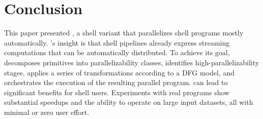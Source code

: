 \documentclass[letterpaper,twocolumn,10pt]{article}
\newcommand{\kk}[1]{[{\color{magenta}kk: #1}]}
\newcommand{\km}[1]{[{\color{blue}km: #1}]}
\begin{document}


  

  


\section{Conclusion}
\label{discussion}

This paper presented \sys, a shell variant that parallelizes shell programs mostly automatically.
\sys's insight is that shell pipelines already express streaming computations that can be automatically distributed.
To achieve its goal, \sys
  decomposes primitives into parallelizability classes,
  identifies high-parallelizability stages,
  applies a series of transformations according to a DFG model,
  and orchestrates the execution of the resulting parallel program.
%
%
  \sys can lead to significant benefits for shell users.
Experiments with real programs show substantial speedups and the ability to operate on large input datasets, all with minimal or zero user effort.
\end{document}
